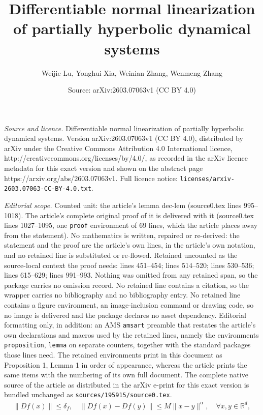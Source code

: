 \documentclass[10pt,a4paper]{amsart}
\title{Differentiable normal linearization of partially hyperbolic dynamical systems}
\author{Weijie Lu, Yonghui Xia, Weinian Zhang, Wenmeng Zhang}
\date{Source: arXiv:2603.07063v1 (CC BY 4.0)}
\begin{document}
\maketitle

\noindent\emph{Source and licence.} Differentiable normal linearization of partially hyperbolic dynamical systems. Version arXiv:2603.07063v1 (CC BY 4.0), distributed by arXiv under the Creative Commons Attribution 4.0 International licence, http://creativecommons.org/licenses/by/4.0/, as recorded in the arXiv licence metadata for this exact version and shown on the abstract page https://arxiv.org/abs/2603.07063v1. Full licence notice: \texttt{licenses/arxiv-2603.07063-CC-BY-4.0.txt}.\par\smallskip

\noindent\textit{Editorial scope.} Counted unit: the article's lemma dec-lem (source0.tex lines 995--1018). The article's complete original proof of it is delivered with it (source0.tex lines 1027--1095, one \texttt{proof} environment of 69 lines, which the article places away from the statement). No mathematics is written, repaired or re-derived: the statement and the proof are the article's own lines, in the article's own notation, and no retained line is substituted or re-flowed.  Retained uncounted as the source-local context the proof needs: lines 451--454; lines 514--520; lines 530--536; lines 615--629; lines 991--993.  Nothing was omitted from any retained span, so the package carries no omission record.  No retained line contains a citation, so the wrapper carries no bibliography and no bibliography entry.  No retained line contains a figure environment, an image-inclusion command or drawing code, so no image is delivered and the package declares no asset dependency.  Editorial formatting only, in addition: an AMS \texttt{amsart} preamble that restates the article's own declarations and macros used by the retained lines, namely the environments \texttt{proposition}, \texttt{lemma} on separate counters, together with the standard packages those lines need.  The retained environments print in this document as Proposition 1, Lemma 1 in order of appearance, whereas the article prints the same items with the numbering of its own full document.  The complete native source of the article as distributed in the arXiv e-print for this exact version is bundled unchanged as \texttt{sources/195915/source0.tex}.
\begin{align}\label{Df-hold}
 \|Df(x)\| \le \delta_f, \quad   
 \|D  f(x)-D  f(y)\| \le M \|x-y\|^\alpha,\quad \forall x,y\in\mathbb{R}^d,
\end{align}
\end{document}
